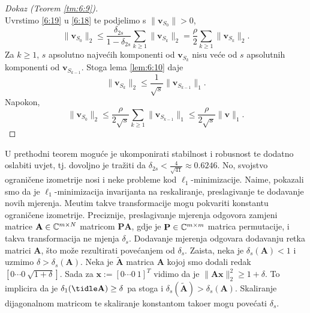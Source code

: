 \documentclass[a4paper,twoside,12pt]{memoir} %
\newcommand{\vect}[1]{\mathbf{#1}}
\renewcommand{\vec}{\vect}
\newcommand{\norm}[1]{\|{#1}\|}
\begin{document}
\begin{proof}[Dokaz (Teorem \ref{tm:6:9})]
\begin{equation}
    \end{equation}
    Uvrstimo \eqref{6:19} u \eqref{6:18} te podjelimo s $\norm{\vec v_{S_0}} > 0$, 
    \begin{equation*}
        \norm{\vec v_{S_0}}_2 \leq \frac{\delta_{2s}}{1 - \delta_{2s}} \sum_{k \geq 1} \norm{\vec v_{S_k}}_2 = \frac{\rho}{2} \sum_{k \geq 1} \norm{\vec v_{S_k}}_2.
    \end{equation*}
    Za $k \geq 1$, $s$ apsolutno najve\'cih komponenti od $\vec v_{S_k}$ nisu ve\'ce od $s$ apsolutnih komponenti od $\vec v_{S_{k-1}}$. Stoga lema \ref{lem:6:10} daje
    \begin{equation*}
        \norm{\vec v_{S_k}}_2 \leq \frac{1}{\sqrt{s}} \norm{\vec v_{S_{k-1}}}_1.
    \end{equation*}
    Napokon, 
    \begin{equation*}
        \norm{\vec v_{S_0}}_2 \leq \frac{\rho}{2 \sqrt{s}} \sum_{k \geq 1} \norm{\vec v_{S_{k-1}}}_1 \leq \frac{\rho}{2 \sqrt{s}} \norm{\vec v}_1. 
    \end{equation*}
\end{proof}

U prethodni teorem mogu\'ce je ukomponirati stabilnost i robusnost te dodatno oslabiti uvjet, tj. dovoljno  je tra\v{z}iti da $\delta_{2s} < \frac{4}{\sqrt{41}} \approx 0.6246$. No, svojstvo ograni\v{c}ene izometrije nosi i neke probleme kod $\ell_1$-minimizacije. Naime, pokazali smo da je $\ell_1$-minimizacija invarijanta na reskaliranje, preslagivanje te dodavanje novih mjerenja. Me\dj utim takve transformacije mogu pokvariti konstantu ograni\v{c}ene izometrije. Preciznije, preslagivanje mjerenja odgovora zamjeni matrice $\vec A \in \C^{m \times N}$ matricom $\vec{PA}$, gdje je $\vec P \in \C^{m \times m}$ matrica permutacije, i takva transformacija ne mjenja $\delta_s$. Dodavanje mjerenja odgovara dodavanju retka matrici $\vec A$, \v{s}to mo\v{z}e rezultirati pove\'canjem od $\delta_s$. Zaista, neka je $\delta_s(\vec A) < 1$ i uzmimo $\delta > \delta_s(\vec A)$. Neka je $\vec{\tilde A}$ matrica $\vec A$ kojoj smo dodali redak $[0 \cdots 0\ \sqrt{1+\delta}]$. Sada za $\vec x := [0 \cdots 0\ 1]^T$ vidimo da je $\norm{\vec{Ax}}^2_2 \geq 1+\delta$. To implicira da je $\delta_1(\vec{\tidle A}) \geq \delta$ pa stoga i $\delta_s(\vec{\tilde A}) > \delta_s(\vec A)$. Skaliranje dijagonalnom matricom te skaliranje konstantom tako\dj er mogu pove\'cati $\delta_s$.
\end{document}
